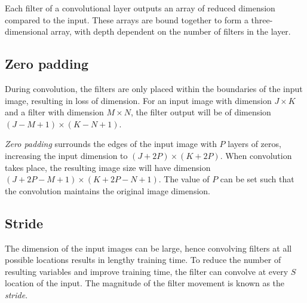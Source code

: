 

Each filter of a convolutional layer outputs an array of reduced dimension compared to the input. These arrays are bound together to form a three-dimensional array, with depth dependent on the number of filters in the layer.

\subsection*{Zero padding}\label{convnets-pad}

During convolution, the filters are only placed within the boundaries of the input image, resulting in loss of dimension. For an input image with dimension $J \times K$ and a filter with dimension $M \times N$, the filter output will be of dimension $(J - M + 1)\times (K - N + 1)$.

\textit{Zero padding} surrounds the edges of the input image with $P$ layers of zeros, increasing the input dimension to  $(J+2P) \times (K+2P)$. When convolution takes place, the resulting image size will have dimension $(J+2P - M + 1) \times (K + 2P - N + 1)$. The value of $P$ can be set such that the convolution maintains the original image dimension.

\subsection*{Stride}\label{convnets-stride}

The dimension of the input images can be large, hence convolving filters at all possible locations results in lengthy training time. To reduce the number of resulting variables and improve training time, the filter can convolve at every $S$ location of the input. The magnitude of the filter movement is known as the \textit{stride}.

